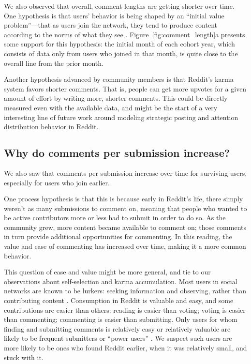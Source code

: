 We also observed that overall, comment lengths are getting shorter over time.  
One hypothesis is that users' behavior is being shaped by an ``initial value problem''---that as users join the network, they tend to produce content according to the norms of what they see \cite{Kooti2010, Danescu-niculescu-mizil2013}. 
Figure~\ref{fig:comment_length}a presents some support for this hypothesis: the initial month of each cohort year, which consists of data only from users who joined in that month, is quite close to the overall line from the prior month.  

Another hypothesis advanced by community members\cite{RedditHypo1} is that Reddit's karma system favors shorter comments.  That is, people can get more upvotes for a given amount of effort by writing more, shorter comments.  This could be directly measured even with the available data, and might be the start of a very interesting line of future work around modeling strategic posting and attention distribution behavior in Reddit. 

\subsection{Why do comments per submission increase?}

We also saw that comments per submission increase over time for surviving users, especially for users who join earlier.

One process hypothesis is that this is because early in Reddit's life, there simply weren't as many submissions to comment on, meaning that people who wanted to be active contributors more or less had to submit in order to do so. 
As the community grew, more content became available to comment on; those comments in turn provide additional opportunities for commenting.  In this reading, the value and ease of commenting has increased over time, making it a more common behavior. 

This question of ease and value might be more general, and tie to our observations about self-selection and karma accumulation.  Most users in social networks are known to be lurkers: seeking information and observing, rather than contributing content \cite{Rafaeli2004, Nonnecke2000}. Consumption in Reddit is valuable and easy, and some contributions are easier than others: reading is easier than voting; voting is easier than commenting; commenting is easier than submitting.  Only users for whom finding and submitting comments is relatively easy or relatively valuable are likely to be frequent submitters or ``power users'' \cite{Panciera2009, Kittur2007}. We suspect such users are more likely to be ones who found Reddit earlier, when it was relatively small, and stuck with it.

